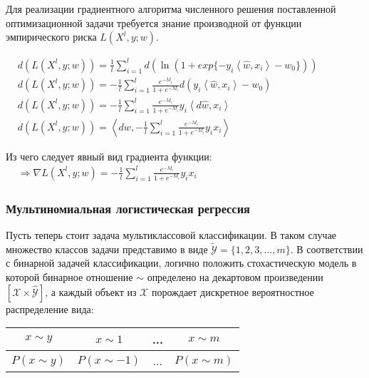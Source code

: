 \documentclass{article}
\begin{document}
        Для реализации градиентного алгоритма численного решения поставленной оптимизационной задачи требуется знание производной от функции эмпирического риска $L(X^l, y; w)$. 
        
    \begin{align*}
        & d(L(X^l, y; w))=\frac{1}{l}\sum^{l}_{i=1}{d(\ln(1+exp\{-y_i\left\langle \hat{w}, x_i \right\rangle -w_0\}))} & & & & & & & & & & & & & & & & & & & &  \\
        & d(L(X^l, y; w))=-\frac{1}{l}\sum^{l}_{i=1}\frac{e^{-M_i}}{1+e^{-M_i}}d(y_i \left\langle \hat{w}, x_i \right\rangle -w_0) & \\
        & d(L(X^l, y; w))=-\frac{1}{l}\sum^{l}_{i=1}\frac{e^{-M_i}}{1+e^{-M_i}}y_i \left\langle d\hat{w}, x_i \right\rangle & \\
        & d(L(X^l, y; w))= \left\langle dw, -\frac{1}{l}\sum^{l}_{i=1}\frac{e^{-M_i}}{1+e^{-M_i}}y_ix_i \right\rangle &
    \end{align*}

        \noindent Из чего следует явный вид градиента функции:
    \begin{align*}
        & \Longrightarrow \nabla L(X^l, y; w) = -\frac{1}{l}\sum^{l}_{i=1}\frac{e^{-M_i}}{1+e^{-M_i}}y_ix_i 
        & & & & & & & & & & & & & & & & & & & & & & & & & & & & & & & & & & & & &
    \end{align*}

    \subsubsection{Мультиномиальная логистическая регрессия}

        Пусть теперь стоит задача мультиклассовой классификации. В таком случае множество классов задачи представимо в виде $\tilde{\mathcal{Y}}=\{1, 2, 3, ..., m\}$. В соответствии с бинарной задачей классификации, логично положить стохастическую модель в которой бинарное отношение $\sim$ определено на декартовом произведении $[\mathcal{X} \times \hat{\mathcal{Y}}]$, а каждый объект из $\mathcal{X}$ порождает дискретное вероятностное распределение вида:
    \begin{center}
        \begin{tabular}{ c|c|c|c } 
             $x \sim y$ & $x \sim 1$ & ... & $x \sim m$ \\
             \hline
             $P(x \sim y)$ & $P(x \sim -1)$ & ... & $P(x \sim m)$\\
        \end{tabular}
    \end{center}
        
\end{document}
